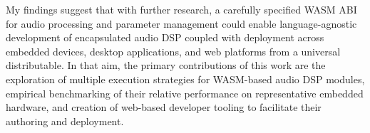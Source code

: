
My findings suggest that with further research, a carefully specified WASM ABI for audio processing and parameter management could enable language-agnostic development of encapsulated audio DSP coupled with deployment across embedded devices, desktop applications, and web platforms from a universal distributable. In that aim, the primary contributions of this work are the exploration of multiple execution strategies for WASM-based audio DSP modules, empirical benchmarking of their relative performance on representative embedded hardware, and creation of web-based developer tooling to facilitate their authoring and deployment.
